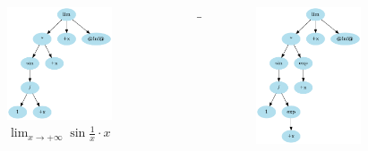 \documentclass[aspectratio=149]{beamer}
\begin{document}
	\begin{frame}
		\begin{columns}
			\begin{column}{0.45\textwidth}
				\begin{figure}
					\includegraphics[width=0.8\textwidth]{pres_img/prima_semplif.png}
					\caption{\(\lim_{x \to +\infty}{\sin{\frac{1}{x}} \cdot x}\)}
				\end{figure}
			\end{column}
			\begin{column}{0.1\textwidth}
				\begin{center}
					$\rightarrow$
				\end{center}
			\end{column}
			\begin{column}{0.45\textwidth}
				\begin{figure}
					\includegraphics[width=0.8\textwidth]{pres_img/replaced.png}

\end{figure}
\end{column}
\end{columns}
\end{frame}
\end{document}
